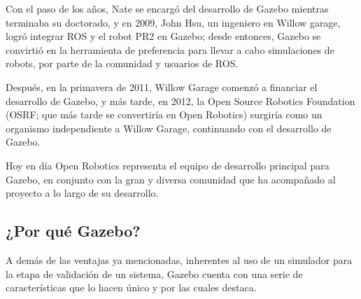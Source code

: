 Con el paso de los años, Nate se encargó del desarrollo de Gazebo mientras terminaba su doctorado, y en 2009, John Hsu, un ingeniero en Willow garage, logró integrar ROS y el robot PR2 en Gazebo; desde entonces, Gazebo se convirtió en la herramienta de preferencia para llevar a cabo simulaciones de robots, por parte de la comunidad y usuarios de ROS.

Después, en la primavera de 2011, Willow Garage comenzó a financiar el desarrollo de Gazebo, y más tarde, en 2012, la Open Source Robotics Foundation (OSRF; que más tarde se convertiría en Open Robotics) surgiría como un organismo independiente a Willow Garage, continuando con el desarrollo de Gazebo. 

Hoy en día Open Robotics representa el equipo de desarrollo principal para Gazebo, en conjunto con la gran y diversa comunidad que ha acompañado al proyecto a lo largo de su desarrollo.

\subsection{¿Por qué Gazebo?}
A demás de las ventajas ya mencionadas, inherentes al uso de un simulador para la etapa de validación de un sistema, Gazebo cuenta con una serie de características que lo hacen único y por las cuales destaca.


